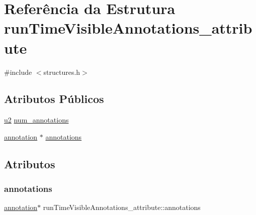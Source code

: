 \hypertarget{structrunTimeVisibleAnnotations__attribute}{}\section{Referência da Estrutura run\+Time\+Visible\+Annotations\+\_\+attribute}
\label{structrunTimeVisibleAnnotations__attribute}


{\ttfamily \#include $<$structures.\+h$>$}

\subsection*{Atributos Públicos}
\begin{DoxyCompactItemize}
\item 
\hyperlink{lista__operandos_8h_a732cde1300aafb73b0ea6c2558a7a54f}{u2} \hyperlink{structrunTimeVisibleAnnotations__attribute_a1b180c3313acd68fb6956135bad01345}{num\+\_\+annotations}
\item 
\hyperlink{structannotation}{annotation} $\ast$ \hyperlink{structrunTimeVisibleAnnotations__attribute_a26ee34fb2f6d38aa18cd692099fe0e40}{annotations}
\end{DoxyCompactItemize}


\subsection{Atributos}
\mbox{\label{structrunTimeVisibleAnnotations__attribute_a26ee34fb2f6d38aa18cd692099fe0e40}} 
\subsubsection{\texorpdfstring{annotations}{annotations}}
{\footnotesize\ttfamily \hyperlink{structannotation}{annotation}$\ast$ run\+Time\+Visible\+Annotations\+\_\+attribute\+::annotations}

\mbox{\label{structrunTimeVisibleAnnotations__attribute_a1b180c3313acd68fb6956135bad01345}} 

